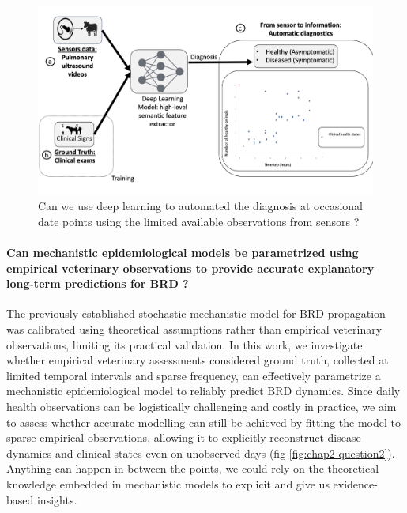 \begin{figure}
  \includegraphics[width=\linewidth]{figures/chap2/chap1-question1.jpg}
  \caption{Can we use deep learning to automated the diagnosis at occasional date points using the limited available observations from sensors ?}
  \label{fig:chap2-question1}
\end{figure}
\newpage
    
\paragraph{Can mechanistic epidemiological models be parametrized using empirical veterinary observations to provide accurate explanatory long-term predictions for BRD ?} The previously established stochastic mechanistic model for BRD propagation \cite{picault_modelling_2022} was calibrated using theoretical assumptions rather than empirical veterinary observations, limiting its practical validation. In this work, we investigate whether empirical veterinary assessments considered ground truth, collected at limited temporal intervals and sparse frequency, can effectively parametrize a mechanistic epidemiological model to reliably predict BRD dynamics. Since daily health observations can be logistically challenging and costly in practice, we aim to assess whether accurate modelling can still be achieved by fitting the model to sparse empirical observations, allowing it to explicitly reconstruct disease dynamics and clinical states even on unobserved days (fig \ref{fig:chap2-question2}). Anything can happen in between the points, we could rely on the theoretical knowledge embedded in mechanistic models to explicit and give us evidence-based insights.



